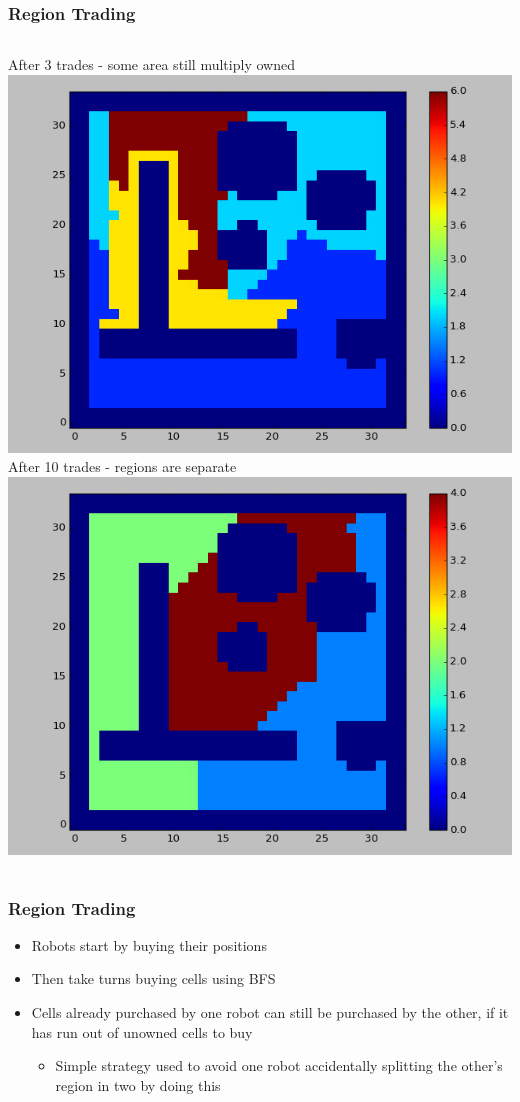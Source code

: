 \documentclass{beamer}
\begin{document}
	\begin{frame}
		\frametitle{Region Trading}
		
		\begin{columns}
			After 3 trades - some area still multiply owned
			\includegraphics[width=\columnwidth]{rt_before.png}
			After 10 trades - regions are separate
			\includegraphics[width=\columnwidth]{rt_after.png}
		\end{columns}
	\end{frame}
	
	\begin{frame}
		\frametitle{Region Trading}
		\begin{itemize}
			\item Robots start by buying their positions
			\item Then take turns buying cells using BFS
			\item Cells already purchased by one robot can still be purchased by the other, if it has run out of unowned cells to buy
			\begin{itemize}
				\item Simple strategy used to avoid one robot accidentally splitting the other's region in two by doing this
			\end{itemize}
		\end{itemize}
	\end{frame}
	
\end{document}
